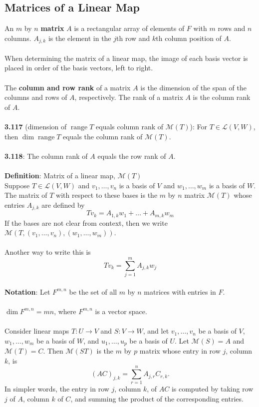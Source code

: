 \documentclass{article}
\DeclareMathOperator{\Range}{range}
\DeclareMathOperator{\Dim}{dim}
\theoremstyle{definition}
\begin{document}
\subsection*{Matrices of a Linear Map}
An $m$ by $n$ \textbf{matrix} $A$ is a rectangular array of elements of $F$ with $m$ rows and $n$ columns. $A_{j, k}$ is the element in the $j$th row and $k$th column position of $A$. \\ \\
When determining the matrix of a linear map, the image of each basis vector is placed in order of the basis vectors, left to right. \\ \\
The \textbf{column and row rank} of a matrix $A$ is the dimension of the span of the columns and rows of $A$, respectively. The rank of a matrix $A$ is the column rank of $A$. \\ \\
\textbf{3.117} (dimension of $\Range{T}$ equals column rank of $\mathcal{M}(T)$): For $T \in \mathcal{L}(V, W)$, then $\Dim{\Range{T}}$ equals the column rank of $\mathcal{M}(T)$. \\ \\
\textbf{3.118}: The column rank of $A$ equals the row rank of $A$. \\ \\
\textbf{Definition}: Matrix of a linear map, $\mathcal{M}(T)$ \\
Suppose $T \in \mathcal{L}(V, W)$ and $v_1, \dots, v_n$ is a basis of $V$ and $w_1, \dots, w_m$ is a basis of $W$. The matrix of $T$ with respect to these bases is the $m$ by $n$ matrix $\mathcal{M}(T)$ whose entries $A_{j, k}$ are defined by $$Tv_k = A_{1, k}w_1 + \dots + A_{m, k}w_m$$
If the bases are  not clear from context, then we write $\mathcal{M}(T, (v_1, \dots, v_n), (w_1, \dots, w_m))$. \\ \\
Another way to write this is $$Tv_k = \sum_{j = 1}^m A_{j, k}w_j$$ \\
\textbf{Notation}: Let $F^{m, n}$ be the set of all $m$ by $n$ matrices with entries in $F$. \\ \\
$\Dim{F^{m, n}} = mn$, where $F^{m, n}$ is a vector space. \\ \\
Consider linear maps $T: U \rightarrow V$ and $S: V \rightarrow W$, and let $v_1, \dots, v_n$ be a basis of $V$, $w_1, \dots, w_m$ be a basis of $W$, and $u_1, \dots, u_p$ be a basis of $U$. Let $\mathcal{M}(S) = A$ and $\mathcal{M}(T) = C$. Then $\mathcal{M}(ST)$ is the $m$ by $p$ matrix whose entry in row $j$, column $k$, is $$(AC)_{j, k} = \sum_{r = 1}^nA_{j, r} C_{r, k}.$$ In simpler words, the entry in row $j$, column $k$, of $AC$ is computed by taking row $j$ of $A$, column $k$ of $C$, and summing the product of the corresponding entries. \\ \\
\end{document}
